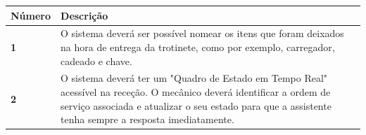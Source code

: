 \documentclass[11pt,a4paper]{article}
\begin{document}
	\begin{tabularx}{\textwidth}{@{}|l|X|@{}}
		\hline
		\rowcolor{gray!10} \textbf{Número} & \textbf{Descrição} \\ \hline
		\textbf{1} & O sistema deverá ser possível nomear os itens que foram deixados na hora de entrega da trotinete, como por exemplo, carregador, cadeado e chave.  \\ \hline
		\textbf{2} & O sistema deverá ter um "Quadro de Estado em Tempo Real" \space acessível na receção. O mecânico deverá identificar a ordem de serviço associada e atualizar o seu estado para que a assistente tenha sempre a resposta imediatamente. \\ \hline	
	\end{tabularx}
	
\end{document}
